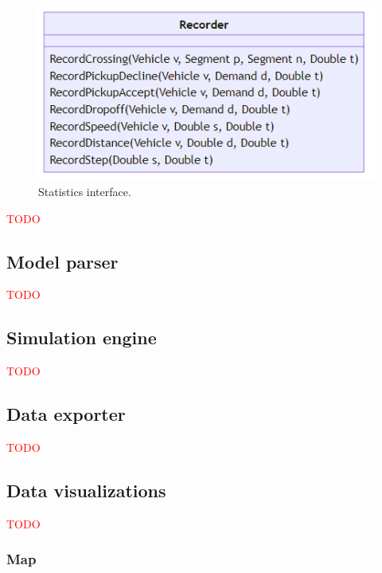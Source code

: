 \documentclass[10pt,twocolumn]{article}
\begin{document}
\begin{figure}[!ht]
    \centering
    \includegraphics[scale=0.4]{../../diagrams/statistics/classes-v2.png}
    \caption{Statistics interface.}
    \label{fig:statistics-interface}
\end{figure}

\textcolor{red}{TODO}

\subsection{Model parser}

\textcolor{red}{TODO}

\subsection{Simulation engine}

\textcolor{red}{TODO}

\subsection{Data exporter}

\textcolor{red}{TODO}

\subsection{Data visualizations}
\label{sec:gui}

\textcolor{red}{TODO}


\subsubsection{Map}
\end{document}
